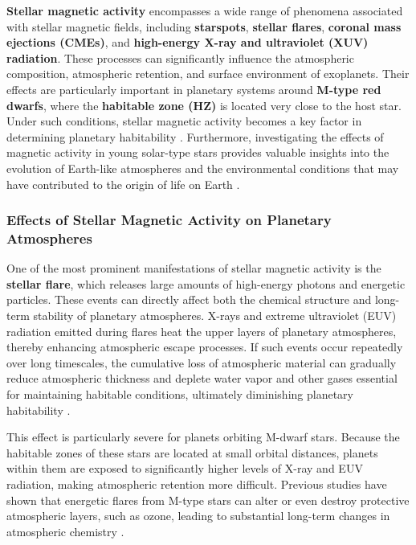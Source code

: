 \textbf{Stellar magnetic activity} encompasses a wide range of phenomena associated with stellar magnetic fields, including \textbf{starspots}, \textbf{stellar flares}, \textbf{coronal mass ejections (CMEs)}, and \textbf{high-energy X-ray and ultraviolet (XUV) radiation}. These processes can significantly influence the atmospheric composition, atmospheric retention, and surface environment of exoplanets. Their effects are particularly important in planetary systems around \textbf{M-type red dwarfs}, where the \textbf{habitable zone (HZ)} is located very close to the host star. Under such conditions, stellar magnetic activity becomes a key factor in determining planetary habitability \cite{gallet2017,ridgway2023}. Furthermore, investigating the effects of magnetic activity in young solar-type stars provides valuable insights into the evolution of Earth-like atmospheres and the environmental conditions that may have contributed to the origin of life on Earth \cite{namekata2026}.


\subsubsection{Effects of Stellar Magnetic Activity on Planetary Atmospheres}

One of the most prominent manifestations of stellar magnetic activity is the \textbf{stellar flare}, which releases large amounts of high-energy photons and energetic particles. These events can directly affect both the chemical structure and long-term stability of planetary atmospheres. X-rays and extreme ultraviolet (EUV) radiation emitted during flares heat the upper layers of planetary atmospheres, thereby enhancing atmospheric escape processes. If such events occur repeatedly over long timescales, the cumulative loss of atmospheric material can gradually reduce atmospheric thickness and deplete water vapor and other gases essential for maintaining habitable conditions, ultimately diminishing planetary habitability \cite{ridgway2023}.

This effect is particularly severe for planets orbiting M-dwarf stars. Because the habitable zones of these stars are located at small orbital distances, planets within them are exposed to significantly higher levels of X-ray and EUV radiation, making atmospheric retention more difficult. Previous studies have shown that energetic flares from M-type stars can alter or even destroy protective atmospheric layers, such as ozone, leading to substantial long-term changes in atmospheric chemistry \cite{chen2021}.

